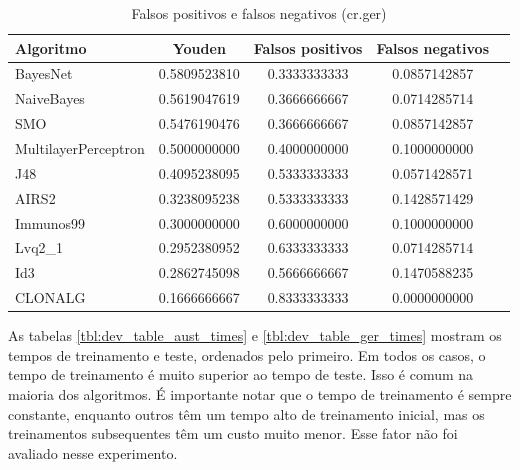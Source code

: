 \begin{table}[h!]
    \vspace{0.5cm}
    \centering
    \caption{Falsos positivos e falsos negativos (cr.ger)}
    \label{tbl:dev_table_ger_youden}
    \vspace{0.5cm}
    \begin{tabular}{|l|c|c|c|c|}
        \hline
        \textbf{Algoritmo} & \textbf{Youden} & \textbf{Falsos positivos} & \textbf{Falsos negativos} \\
        \hline
        \rowcolor[gray]{.9}
        BayesNet             & 0.5809523810 & 0.3333333333 & 0.0857142857 \\ \hline
        \rowcolor[gray]{.9}
        NaiveBayes           & 0.5619047619 & 0.3666666667 & 0.0714285714 \\ \hline
        \rowcolor[gray]{.9}
        SMO                  & 0.5476190476 & 0.3666666667 & 0.0857142857 \\ \hline
        MultilayerPerceptron & 0.5000000000 & 0.4000000000 & 0.1000000000 \\ \hline
        J48                  & 0.4095238095 & 0.5333333333 & 0.0571428571 \\ \hline
        AIRS2                & 0.3238095238 & 0.5333333333 & 0.1428571429 \\ \hline
        Immunos99            & 0.3000000000 & 0.6000000000 & 0.1000000000 \\ \hline
        Lvq2\_1              & 0.2952380952 & 0.6333333333 & 0.0714285714 \\ \hline
        Id3                  & 0.2862745098 & 0.5666666667 & 0.1470588235 \\ \hline
        CLONALG              & 0.1666666667 & 0.8333333333 & 0.0000000000 \\ \hline
    \end{tabular}
    \vspace{0.5cm}
\end{table}

As tabelas \ref{tbl:dev_table_aust_times} e \ref{tbl:dev_table_ger_times} mostram os tempos de treinamento e teste, ordenados pelo primeiro. Em todos os casos, o tempo de treinamento é muito superior ao tempo de teste. Isso é comum na maioria dos algoritmos. É importante notar que o tempo de treinamento é sempre constante, enquanto outros têm um tempo alto de treinamento inicial, mas os treinamentos subsequentes têm um custo muito menor. Esse fator não foi avaliado nesse experimento.

